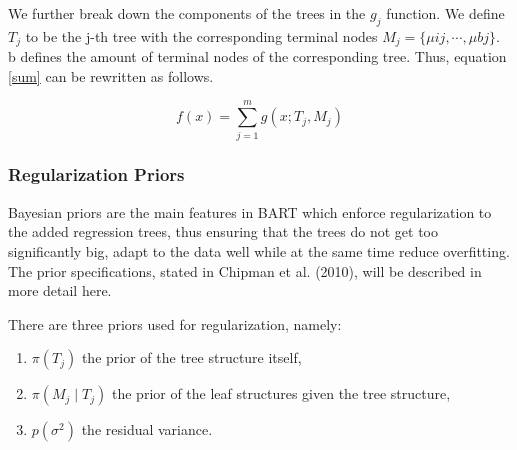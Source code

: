 \documentclass{usiinftr}
\begin{document}
We further break down the components of the trees in the $g_j$ function. We define $T_j$ to be the j-th tree with the corresponding terminal nodes $M_j = \{ \mu{ij}, \cdots, \mu{bj} \}$. b defines the amount of terminal nodes of the corresponding tree. Thus, equation \ref{sum} can be rewritten as follows.

\begin{equation} \label{sum1}
f(x)= \sum_{j=1}^{m} g(x;T_j,M_j)
\end{equation}

\subsubsection{Regularization Priors}
Bayesian priors are the main features in BART which enforce regularization to the added regression trees, thus ensuring that the trees do not get too significantly big, adapt to the data well while at the same time reduce overfitting. The prior specifications, stated in Chipman et al. (2010), will be described in more detail here.

There are three priors used for regularization, namely:
\begin{enumerate}
\item $\pi(T_j)$ the prior of the tree structure itself,
\item $\pi(M_j \mid T_j)$ the prior of the leaf structures given the tree structure, 
\item $p(\sigma^2)$ the residual variance.
\end{enumerate}
\end{document}
